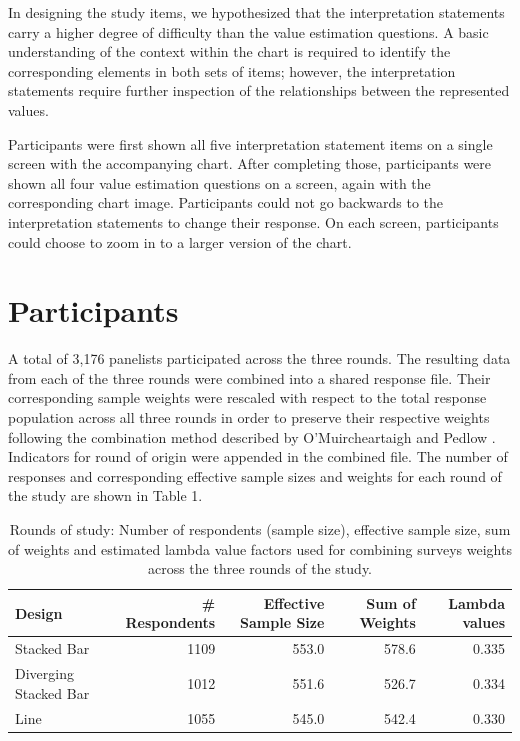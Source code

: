 \documentclass{IEEEcsmag}
\begin{document}
In designing the study items, we hypothesized that the interpretation statements carry a higher degree of difficulty than the value estimation questions. A basic understanding of the context within the chart is required to identify the corresponding elements in both sets of items; however, the interpretation statements require further inspection of the relationships between the represented values.

Participants were first shown all five interpretation statement items on a single screen with the accompanying chart. After completing those, participants were shown all four value estimation questions on a screen, again with the corresponding chart image. Participants could not go backwards to the interpretation statements to change their response. On each screen, participants could choose to zoom in to a larger version of the chart.

\section{Participants}\label{participants}

A total of 3,176 panelists participated across the three rounds. The resulting data from each of the three rounds were combined into a shared response file. Their corresponding sample weights were rescaled with respect to the total response population across all three rounds in order to preserve their respective weights following the combination method described by O'Muircheartaigh and Pedlow . Indicators for round of origin were appended in the combined file. The number of responses and corresponding effective sample sizes and weights for each round of the study are shown in Table 1.

\begin{table}
\label{participantstable}
\caption{Rounds of study: Number of respondents (sample size), effective sample size, sum of weights and estimated lambda value factors used for combining surveys weights across the three rounds of the study.}

\begin{tabular}[t]{lrrrr}
\toprule
Design & \# Respondents & Effective Sample Size & Sum of Weights & Lambda values\\
\midrule
Stacked Bar & 1109 & 553.0 & 578.6 & 0.335\\
Diverging Stacked Bar & 1012 & 551.6 & 526.7 & 0.334\\
Line & 1055 & 545.0 & 542.4 & 0.330\\
\bottomrule
\end{tabular}
\end{table}
\end{document}
